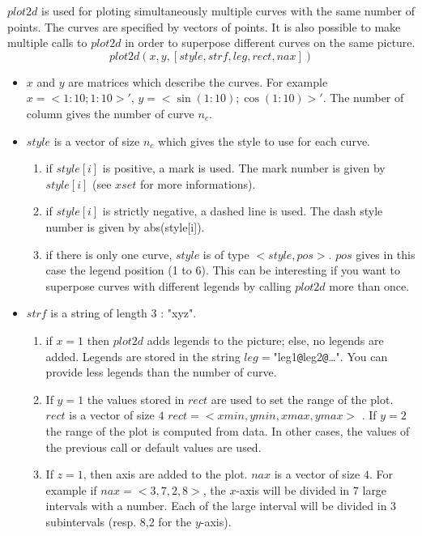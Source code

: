$plot2d$ is used for ploting simultaneously multiple curves 
with the same number of points. 
 The curves are specified by vectors of points. It is also possible to 
	make multiple  calls to $plot2d$ in order to superpose 
	different curves on the same picture.
\[
  plot2d(x,y,[style,strf,leg,rect,nax])
\]
\begin{itemize}
\item $x$ and $y$ are matrices which describe the curves. For example 
$x=< 1:10;1:10>'$, $y= < \sin(1:10);\cos(1:10)>'$. The number of column 
 gives the number of curve $n_c$.
\item $style$ is a vector of size $n_c$ which gives the style to use for each curve.
\begin{enumerate}
\item   if $style[i]$ is positive, a mark is used. The mark number is given by $style[i]$ (see $xset$ for more informations).
\item   if $style[i]$ is strictly negative, a dashed line is used.
	 The dash style number  is given by  abs(style[i]).
\item   if there is only one curve, $style$ is of type $<style,pos>$.
          $pos$ gives in this case the legend position (1 to 6). This can be 
	interesting  if you want to superpose curves with different legends by 
        calling $plot2d$ more than once.
\end{enumerate}
\item $strf$ is a string of length 3 : "xyz".
\begin{enumerate}
\item   if $x=1$ then $plot2d$ adds legends  to the picture;
        else, no legends are added. Legends are stored in the string
	 $leg=$"leg1\verb+@+leg2\verb+@+\ldots". You can provide less legends
	than the number of curve.
\item If $y=1$ the values stored in $rect$ are used to set the range of the 
        plot. $rect$ is a vector of size $4$ $rect=<xmin,ymin,xmax,ymax>$
        . If $y=2$ the range of the plot is computed from data. In other 
	cases, the values of the previous call or default values  are used.
\item If $z=1$, then axis are added to the plot. $nax$ is a vector of size $4$.
	For example if $nax=<3,7,2,8>$, 
      the $x$-axis will be divided in $7$ large intervals with a number.
      Each of the large interval will be 
     divided in $3$ subintervals (resp. 8,2 for the $y$-axis).
\end{enumerate}
\end{itemize}

